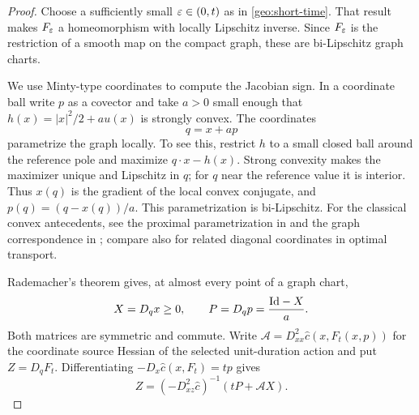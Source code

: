 \begin{proof}
Choose a sufficiently small $\varepsilon\in(0,t)$ as in
\cref{geo:short-time}.  That result makes $F_\varepsilon$ a homeomorphism
with locally Lipschitz inverse.  Since $F_\varepsilon$ is the restriction
of a smooth map on the compact graph, these are bi-Lipschitz graph
charts.

We use Minty-type coordinates to compute the Jacobian sign.  In a
coordinate ball write $p$ as a covector and take $a>0$ small enough that
$h(x)=|x|^2/2+a u(x)$ is strongly convex.  The coordinates
\[
 q=x+ap
\]
parametrize the graph locally.  To see this, restrict $h$ to a small
closed ball around the reference pole and maximize $q\cdot x-h(x)$.
Strong convexity makes the maximizer unique and Lipschitz in $q$;
for $q$ near the reference value it is interior.  Thus $x(q)$ is
the gradient of the local convex conjugate, and
$p(q)=(q-x(q))/a$.  This parametrization is bi-Lipschitz.
For the classical convex antecedents, see the proximal parametrization
in \cite[Section~12]{Moreau1965} and the graph correspondence in
\cite[Proposition~1.1]{AA1999}; compare also
\cite[Section~2]{MPW2012} for related diagonal coordinates in optimal
transport.

Rademacher's theorem \cite[Chapter~2, Theorem~1.4]{Simon2018} gives,
at almost every point of a graph chart,
\begin{equation}
 \label{geo:minty-matrices}
 X=D_qx\geq0,
 \qquad P=D_qp=\frac{\mathrm{Id}-X}{a}.
\end{equation}
Both matrices are symmetric and commute.  Write
$\mathscr A=D^2_{xx}\hat c(x,F_t(x,p))$ for the coordinate source
Hessian of the selected unit-duration action and put $Z=D_qF_t$.
Differentiating $-D_x\hat c(x,F_t)=tp$ gives
\begin{equation}
 \label{geo:projection-matrix}
 Z=(-D^2_{xz}\hat c)^{-1}(tP+\mathscr A X).
\end{equation}


\end{proof}
